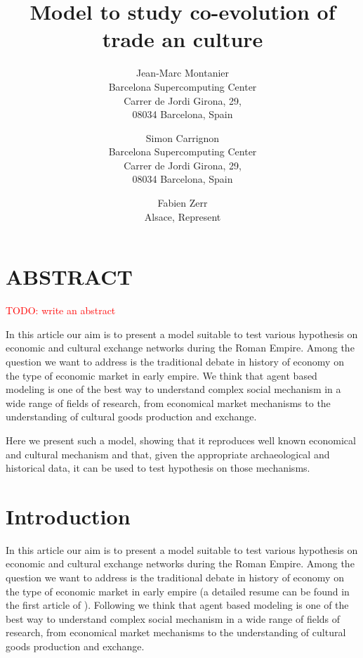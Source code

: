 \documentclass{wscpaperproc}
\newcommand{\memo}[2]{\textcolor{#1}{#2}}
\newcommand{\todo}[1]{\memo{red}{TODO: #1\\}}
\begin{document}

\title{Model to study co-evolution of trade an culture}

\author{Jean-Marc Montanier\\ [12pt]
Barcelona Supercomputing Center\\
Carrer de Jordi Girona, 29, \\
08034 Barcelona, Spain\\
\and
Simon Carrignon\\ [12pt]
Barcelona Supercomputing Center\\
Carrer de Jordi Girona, 29, \\
08034 Barcelona, Spain\\
\and
Fabien Zerr\\ [12pt]
Alsace, Represent
}






\maketitle


\section*{ABSTRACT}
\todo{write an abstract}

In this article our aim is to present a model suitable to test various hypothesis on economic and cultural exchange networks during the Roman Empire. Among the question we want to address is the traditional debate in history of economy on the type of economic market in early empire. We think that agent based modeling is one of the best way to understand complex social mechanism in a wide range of fields of research, from economical market mechanisms to the understanding of cultural goods production and exchange.

Here we present such a model, showing that it reproduces well known economical and cultural mechanism and that, given the appropriate archaeological and historical data, it can be used to test hypothesis on those mechanisms.


\section{Introduction}
In this article our aim is to present a model suitable to test various hypothesis on economic and cultural exchange networks during the Roman Empire. Among the question we want to address is the traditional debate in history of economy on the type of economic market in early empire (a detailed resume can be found in the first article of \cite{polanyi_trade_1957}). Following \cite{epstein_growing_1996,
lake_trends_2014,
kohler_dynamics_2000,
tesfatsion_agent-based_2003} we think that agent based modeling is one of the best way to understand complex social mechanism in a wide range of fields of research, from economical market mechanisms to the understanding of cultural goods production and exchange.
\end{document}
